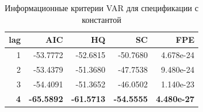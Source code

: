 \begin{table}[H]
\centering
\small

\begin{tabular}{r|r|r|r|r}
\hline
lag & AIC & HQ & SC & FPE\\
\hline
1 & -53.7772 & -52.6815 & -50.7680 & 4.678e-24\\
\hline
2 & -53.4379 & -51.3680 & -47.7538 & 9.480e-24\\
\hline
3 & -54.4091 & -51.3652 & -46.0502 & 1.140e-23\\
\hline
\textbf{4} & \textbf{-65.5892} & \textbf{-61.5713} & \textbf{-54.5555} & \textbf{4.480e-27}\\
\hline
\end{tabular}
\caption{Информационные критерии VAR для спецификации с константой}
\label{tab:var_ic_const}
\end{table}
